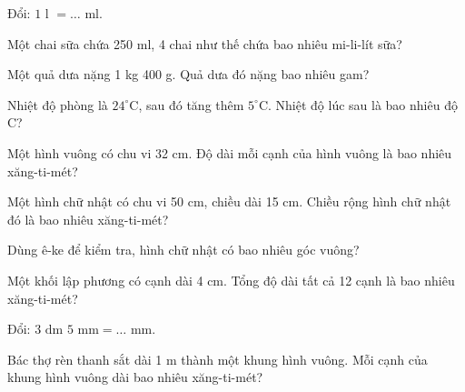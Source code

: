 \begin{ex}
Đổi: $1\text{ l } = \dots\text{ ml}$.
\end{ex}

\begin{ex}
Một chai sữa chứa 250 ml, 4 chai như thế chứa bao nhiêu mi-li-lít sữa?
\end{ex}

\begin{ex}
Một quả dưa nặng 1 kg 400 g. Quả dưa đó nặng bao nhiêu gam?
\end{ex}

\begin{ex}
Nhiệt độ phòng là $24^\circ$C, sau đó tăng thêm $5^\circ$C. Nhiệt độ lúc sau là bao nhiêu độ C?
\end{ex}

\begin{ex}
Một hình vuông có chu vi 32 cm. Độ dài mỗi cạnh của hình vuông là bao nhiêu xăng-ti-mét?
\end{ex}

\begin{ex}
Một hình chữ nhật có chu vi 50 cm, chiều dài 15 cm. Chiều rộng hình chữ nhật đó là bao nhiêu xăng-ti-mét?
\end{ex}

\begin{ex}
Dùng ê-ke để kiểm tra, hình chữ nhật có bao nhiêu góc vuông?
\end{ex}

\begin{ex}
Một khối lập phương có cạnh dài 4 cm. Tổng độ dài tất cả 12 cạnh là bao nhiêu xăng-ti-mét?
\end{ex}

\begin{ex}
Đổi: $3\text{ dm } 5\text{ mm} = \dots\text{ mm}$.
\end{ex}

\begin{ex}
Bác thợ rèn thanh sắt dài 1 m thành một khung hình vuông. Mỗi cạnh của khung hình vuông dài bao nhiêu xăng-ti-mét?
\end{ex}

